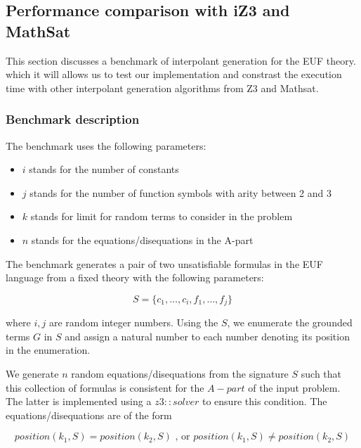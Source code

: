 \subsection{Performance comparison with iZ3 and MathSat}\label{performance_euf}

This section discusses a benchmark of interpolant generation
for the EUF theory.
which it will allows us to test 
our implementation and constrast the execution 
time with other interpolant generation
algorithms from Z3 and Mathsat.

\subsubsection{Benchmark description}

The benchmark uses the following parameters:

\begin{itemize}
  \item $i$ stands for the number of constants
  \item $j$ stands for the number of function symbols
    with arity between 2 and 3
  \item $k$ stands for limit for random terms to consider
    in the problem
  \item $n$ stands for the equations/disequations in the
    A-part
\end{itemize}

The benchmark generates a pair of two unsatisfiable formulas
in the EUF language from a fixed theory with the following parameters:

\begin{equation*}
  S = \{ c_1, \dots, c_i, f_1, \dots, f_j \}
\end{equation*}

where $i, j$ are random integer numbers. Using the $S$, we
enumerate the grounded terms $G$ in $S$ and assign a natural 
number to each number denoting its position in the enumeration.

We generate $n$ random equations/disequations from the signature $S$ 
such that this
collection of formulas is consistent for the $A-part$ of
the input problem. 
The latter is implemented using a $z3: :solver$ to ensure 
this condition.
The equations/disequations are of the form

\begin{equation*}
  position(k_1, S) = position(k_2, S) \text{ , or } position(k_1, S) \neq position(k_2, S) 
\end{equation*}

